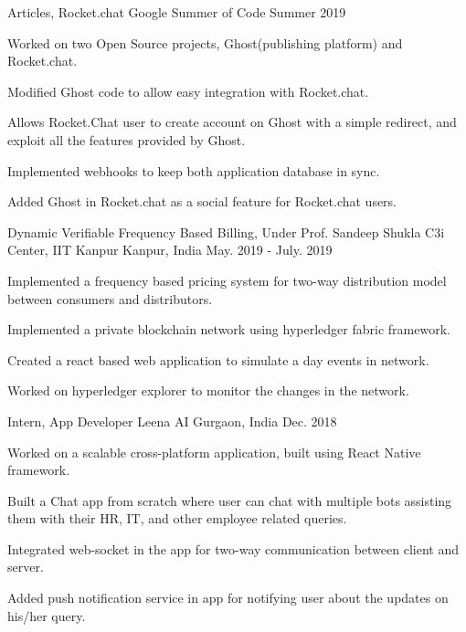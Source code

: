 \begin{cventries}

  \cventry
  {Articles, Rocket.chat}
  {Google Summer of Code}
  {}
  {Summer 2019}
  {
    \begin{cvitems}
      \item {Worked on two Open Source projects, Ghost(publishing platform) and Rocket.chat.}
      \item {Modified Ghost code to allow easy integration with Rocket.chat.}
      \item {Allows Rocket.Chat user to create account on Ghost with a simple redirect, and exploit all the features provided by Ghost.}
      \item {Implemented webhooks to keep both application database in sync.}
      \item {Added Ghost in Rocket.chat as a social feature for Rocket.chat users.}
    \end{cvitems}
  }
  
    \cventry
  {Dynamic Verifiable Frequency Based Billing, Under Prof. Sandeep Shukla}
  {C3i Center, IIT Kanpur}
  {Kanpur, India}
  {May. 2019 - July. 2019}
  {
    \begin{cvitems}
          \item {Implemented a frequency based pricing system for two-way distribution model between consumers and distributors.}
          \item {Implemented a private blockchain network using hyperledger fabric framework.}
          \item {Created a react based web application to simulate a day events in network.}
          \item {Worked on hyperledger explorer to monitor the changes in the network.}
    \end{cvitems}
  }
  
    \cventry
  {Intern, App Developer}
  {Leena AI}
  {Gurgaon, India}
  {Dec. 2018}
  {
    \begin{cvitems}
          \item {Worked on a scalable cross-platform application, built using React Native framework.}
          \item {Built a Chat app from scratch where user can chat with multiple bots assisting them with their HR, IT, and other employee related queries.}
          \item {Integrated web-socket in the app for two-way communication between client and server.}
          \item {Added push notification service in app for notifying user about the updates on his/her query.}
    \end{cvitems}
  }


\end{cventries}
